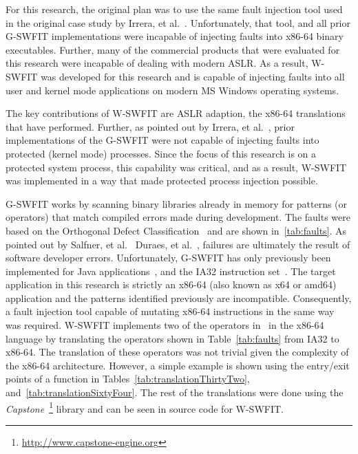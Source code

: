 For this research, the original plan was to use the same fault injection tool
used in the original case study by Irrera, et al.~\cite{irrera2015}.
Unfortunately, that tool, and all prior \ac{G-SWFIT} implementations were
incapable of injecting faults into x86-64 binary executables.  Further, many of
the commercial products that were evaluated for this research were incapable of
dealing with modern \ac{ASLR}.  As a result, \ac{W-SWFIT} was developed for
this research and is capable of injecting faults into all user and kernel mode
applications on modern \ac{MS} Windows operating systems.  

The key contributions of \ac{W-SWFIT} are \ac{ASLR} adaption, the x86-64
translations that have performed.  Further, as pointed out by Irrera, et
al.~\cite{irrera2013a}, prior implementations of the \ac{G-SWFIT} were not
capable of injecting faults into protected (kernel mode) processes.  Since the
focus of this research is on a protected system process, this capability was
critical, and as a result, \ac{W-SWFIT} was implemented in a way that made
protected process injection possible.  

\ac{G-SWFIT} works by scanning binary libraries already in memory for patterns
(or operators) that match compiled errors made during development.  The faults
were based on the Orthogonal Defect Classification~\cite{bridge1998} and are
shown in~\ref{tab:faults}.  As pointed out by Salfner, et
al.~\cite{salfnerSurvey} Duraes, et al.~\cite{gswfit}, failures are ultimately
the result of software developer errors.  Unfortunately, \ac{G-SWFIT} has only
previously been implemented for Java
applications~\cite{sanches2011jswfit,martins2002jaca}, and the IA32 instruction
set~\cite{gswfit}.  The target application in this research is strictly an
x86-64 (also known as x64 or amd64) application and the patterns identified
previously are incompatible.  Consequently, a fault injection tool capable of
mutating x86-64 instructions in the same way was required.  \ac{W-SWFIT}
implements two of the operators in~\cite{gswfit} in the x86-64 language by
translating the operators shown in Table~\ref{tab:faults} from IA32 to x86-64.
The translation of these operators was not trivial given the complexity of the
x86-64 architecture.  However, a simple example is shown using the entry/exit
points of a function in Tables~\ref{tab:translationThirtyTwo},
and~\ref{tab:translationSixtyFour}.  The rest of the translations were done
using the \emph{Capstone}~\footnote{\url{http://www.capstone-engine.org}}
library and can be seen in source code for \ac{W-SWFIT}.

